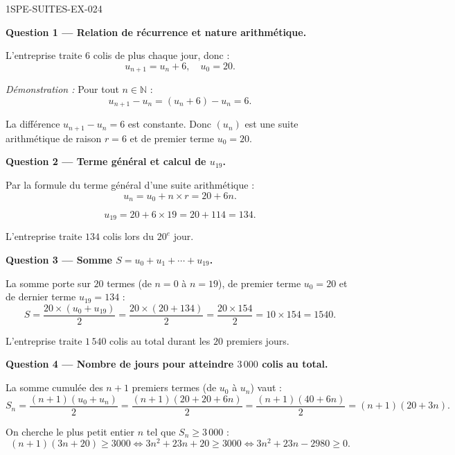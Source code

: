 \begin{corrige}{1SPE-SUITES-EX-024}

\textbf{Question 1 — Relation de récurrence et nature arithmétique.}

L'entreprise traite $6$ colis de plus chaque jour, donc :
\[
  u_{n+1} = u_n + 6, \quad u_0 = 20.
\]

\textit{Démonstration :} Pour tout $n \in \mathbb{N}$ :
\[
  u_{n+1} - u_n = (u_n + 6) - u_n = 6.
\]


La différence $u_{n+1} - u_n = 6$ est constante. Donc $(u_n)$ est une suite arithmétique de raison $r = 6$ et de premier terme $u_0 = 20$.

\medskip
\textbf{Question 2 — Terme général et calcul de $u_{19}$.}

Par la formule du terme général d'une suite arithmétique :
\[
  u_n = u_0 + n \times r = 20 + 6n.
\]

\[
  u_{19} = 20 + 6 \times 19 = 20 + 114 = 134.
\]

L'entreprise traite $134$ colis lors du $20^e$ jour.

\medskip
\textbf{Question 3 — Somme $S = u_0 + u_1 + \cdots + u_{19}$.}


La somme porte sur $20$ termes (de $n = 0$ à $n = 19$), de premier terme $u_0 = 20$ et de dernier terme $u_{19} = 134$ :
\[
  S = \frac{20 \times (u_0 + u_{19})}{2} = \frac{20 \times (20 + 134)}{2} = \frac{20 \times 154}{2} = 10 \times 154 = 1540.
\]

L'entreprise traite $\boxed{1\,540}$ colis au total durant les $20$ premiers jours.

\medskip
\textbf{Question 4 — Nombre de jours pour atteindre $3\,000$ colis au total.}

La somme cumulée des $n+1$ premiers termes (de $u_0$ à $u_n$) vaut :
\[
  S_n = \frac{(n+1)(u_0 + u_n)}{2} = \frac{(n+1)(20 + 20 + 6n)}{2} = \frac{(n+1)(40 + 6n)}{2} = (n+1)(20 + 3n).
\]

On cherche le plus petit entier $n$ tel que $S_n \geq 3\,000$ :
\[
  (n+1)(3n + 20) \geq 3000 \iff 3n^2 + 23n + 20 \geq 3000 \iff 3n^2 + 23n - 2980 \geq 0.
\]



\end{corrige}
